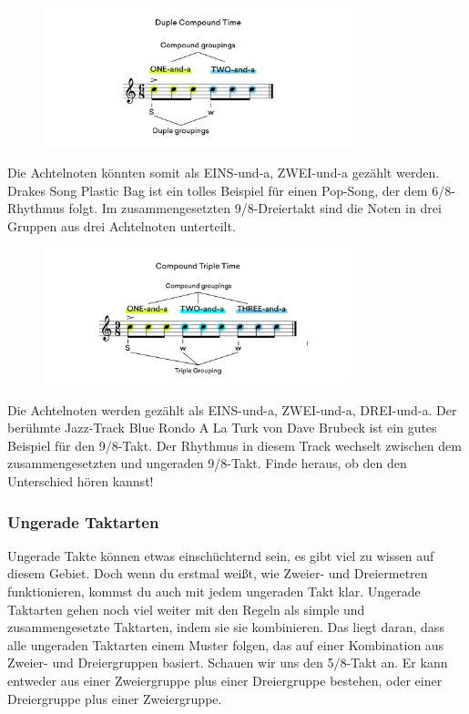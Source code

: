 \begin{figure}[H]
    \centering
    \includegraphics[width=0.8\textwidth]{images/Rythm_body_8}
\end{figure}

Die Achtelnoten könnten somit als EINS-und-a, ZWEI-und-a gezählt werden. Drakes Song Plastic Bag ist ein tolles Beispiel für einen Pop-Song, der dem 6/8-Rhythmus folgt. Im zusammengesetzten 9/8-Dreiertakt sind die Noten in drei Gruppen aus drei Achtelnoten unterteilt.

\begin{figure}[H]
    \centering
    \includegraphics[width=0.8\textwidth]{images/Rythm_body_9}
\end{figure}

Die Achtelnoten werden gezählt als EINS-und-a, ZWEI-und-a, DREI-und-a. Der berühmte Jazz-Track Blue Rondo A La Turk von Dave Brubeck ist ein gutes Beispiel für den 9/8-Takt. Der Rhythmus in diesem Track wechselt zwischen dem zusammengesetzten und ungeraden 9/8-Takt. Finde heraus, ob den den Unterschied hören kannst!

\subsubsection{Ungerade Taktarten}
Ungerade Takte können etwas einschüchternd sein, es gibt viel zu wissen auf diesem Gebiet. Doch wenn du erstmal weißt, wie Zweier- und Dreiermetren funktionieren, kommst du auch mit jedem ungeraden Takt klar. Ungerade Taktarten gehen noch viel weiter mit den Regeln als simple und zusammengesetzte Taktarten, indem sie sie kombinieren. Das liegt daran, dass alle ungeraden Taktarten einem Muster folgen, das auf einer Kombination aus Zweier- und Dreiergruppen basiert. Schauen wir uns den 5{/8}-Takt an. Er kann entweder aus einer Zweiergruppe plus einer Dreiergruppe bestehen, oder einer Dreiergruppe plus einer Zweiergruppe.


